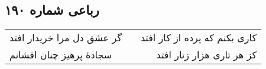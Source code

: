 \begin{center}
\section*{رباعی شماره ۱۹۰}
\label{sec:sh190}
\begin{longtable}{l p{0.5cm} r}
گر عشق دل مرا خریدار افتد
&&
کاری بکنم که پرده از کار افتد
\\
سجادهٔ پرهیز چنان افشانم
&&
کز هر تاری هزار زنار افتد
\\
\end{longtable}
\end{center}
